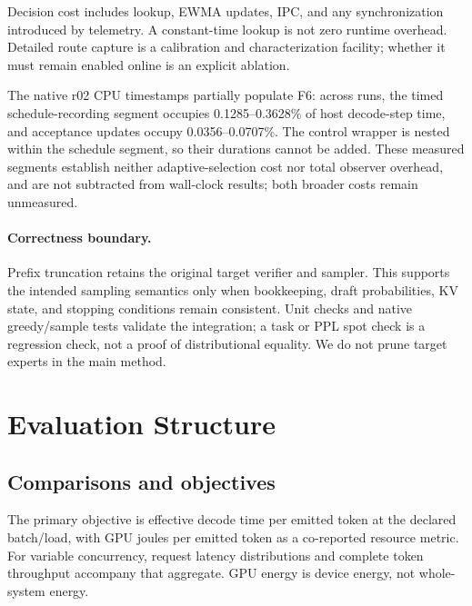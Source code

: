 \documentclass[10pt,twocolumn]{article}
\begin{document}
Decision cost includes lookup, EWMA updates, IPC, and any synchronization introduced by telemetry. A constant-time lookup is not zero runtime overhead. Detailed route capture is a calibration and characterization facility; whether it must remain enabled online is an explicit ablation.

The native r02 CPU timestamps partially populate F6: across runs, the timed schedule-recording segment occupies 0.1285--0.3628\% of host decode-step time, and acceptance updates occupy 0.0356--0.0707\%. The control wrapper is nested within the schedule segment, so their durations cannot be added. These measured segments establish neither adaptive-selection cost nor total observer overhead, and are not subtracted from wall-clock results; both broader costs remain unmeasured.

\paragraph{Correctness boundary.} Prefix truncation retains the original target verifier and sampler. This supports the intended sampling semantics only when bookkeeping, draft probabilities, KV state, and stopping conditions remain consistent. Unit checks and native greedy/sample tests validate the integration; a task or PPL spot check is a regression check, not a proof of distributional equality. We do not prune target experts in the main method.

\section{Evaluation Structure}
\subsection{Comparisons and objectives}
The primary objective is effective decode time per emitted token at the declared batch/load, with GPU joules per emitted token as a co-reported resource metric. For variable concurrency, request latency distributions and complete token throughput accompany that aggregate. GPU energy is device energy, not whole-system energy.
\end{document}
